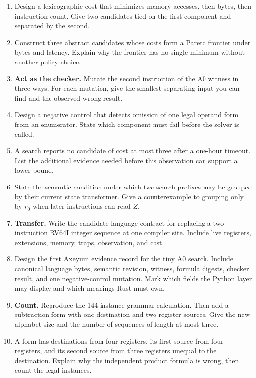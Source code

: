 \begin{enumerate}
\item Design a lexicographic cost that minimizes memory accesses, then bytes,
then instruction count. Give two candidates tied on the first component and
separated by the second.

\item Construct three abstract candidates whose costs form a Pareto frontier
under bytes and latency. Explain why the frontier has no single minimum
without another policy choice.

\item \textbf{Act as the checker.} Mutate the second instruction of the A0
witness in three ways. For each mutation, give the smallest separating input
you can find and the observed wrong result.

\item Design a negative control that detects omission of one legal operand
form from an enumerator. State which component must fail before the solver is
called.

\item A search reports no candidate of cost at most three after a one-hour
timeout. List the additional evidence needed before this observation can
support a lower bound.

\item State the semantic condition under which two search prefixes may be
grouped by their current state transformer. Give a counterexample to grouping
only by \(r_0\) when later instructions can read \(Z\).

\item \textbf{Transfer.} Write the candidate-language contract for replacing
a two-instruction RV64I integer sequence at one compiler site. Include live
registers, extensions, memory, traps, observation, and cost.

\item Design the first Axeyum evidence record for the tiny A0 search. Include
canonical language bytes, semantic revision, witness, formula digests,
checker result, and one negative-control mutation. Mark which fields the
Python layer may display and which meanings Rust must own.

\item \textbf{Count.} Reproduce the 144-instance grammar calculation. Then add
a subtraction form with one destination and two register sources. Give the
new alphabet size and the number of sequences of length at most three.

\item A form has destinations from four registers, its first source from four
registers, and its second source from three registers unequal to the
destination. Explain why the independent product formula is wrong, then count
the legal instances.


\end{enumerate}
